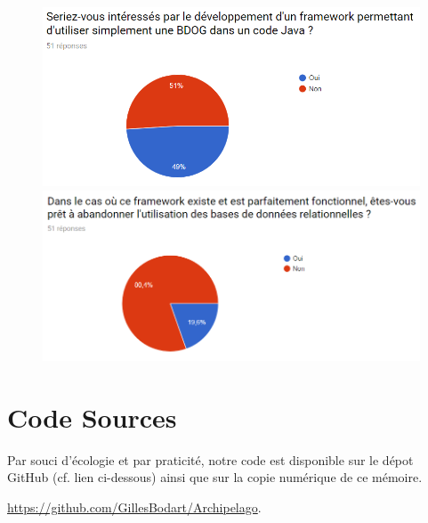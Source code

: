 \documentclass[a4paper,fleqn,12pt,oneside]{report}
\begin{document}
\begin{figure}[htp]
\centering
    \includegraphics[width=.45\textwidth]{figures/11.png}\quad
    \includegraphics[width=.45\textwidth]{figures/12.png}
\end{figure}


\chapter*{Code Sources}

Par souci d'écologie et par praticité, notre code est disponible sur le dépot GitHub (cf. lien ci-dessous) ainsi que sur la copie numérique de ce mémoire.

 \url{https://github.com/GillesBodart/Archipelago}. 
%

 
\end{document}
